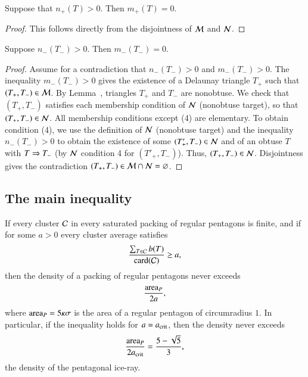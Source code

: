 \begin{lemma}  
  Suppose that $n_+(T)>0$. Then $m_+(T)=0$.
\end{lemma}

\begin{proof} 
  This follows directly from the disjointness of $\mathcal M$ and $\mathcal N$.
\end{proof}

\begin{lemma}  
  Suppose $n_-(T_-)>0$.  Then $m_-(T_-)=0$.
\end{lemma}

\begin{proof}
Assume for a contradiction that $n_-(T_-)>0$ and $m_-(T_-)>0$.  The
inequality $m_-(T_-)>0$ gives the existence of a Delaunay triangle
$T_+$ such that $(T_+,T_-)\in\mathcal M$.  By Lemma~,
triangles $T_+$ and $T_-$ are nonobtuse.  We check
that $(T_+,T_-)$ satisfies each membership condition of $\mathcal N$
(nonobtuse target), so that $(T_+,T_-)\in\mathcal N$.  All membership
conditions except (4) are elementary. To obtain condition (4), we use
the definition of $\mathcal N$ (nonobtuse target) and the inequality
$n_-(T_-)>0$ to obtain the existence of some $(T'_+,T_-)\in\mathcal N$ and of
an obtuse $T$ with $T\Rightarrow T_-$ (by $\mathcal N$ condition 4 for $(T'_+,T_-)$).  Thus,
$(T_+,T_-)\in\mathcal N$. Disjointness gives the contradiction
$(T_+,T_-)\in\mathcal M\cap\mathcal N=\varnothing$.
\end{proof}

\subsection{The main inequality}

\begin{lemma}  
If  every cluster $\mathcal C$ in every saturated packing of regular
  pentagons is finite, and if for some $a>0$ every cluster average
  satisfies
\begin{equation}\libel{eqn:main}
\frac{\sum_{T\in \C} b(T)}{\card(\C)} \ge a,
\end{equation}
then the density of a packing of regular pentagons never exceeds 
\[
\frac{{\operatorname{area}}_P} {2 a},
\]
where ${\operatorname{area}}_P = 5\kappa\sigma$ is the area of a regular pentagon of
circumradius $1$.  In particular, if the inequality holds for
$a=a_\text{crit}$, then the density never exceeds
\[
\frac{{\operatorname{area}}_P}{2 a_\text{crit}} = \frac{5 - \sqrt{5}}{3},
\] %
the density of the pentagonal ice-ray.
\end{lemma}

